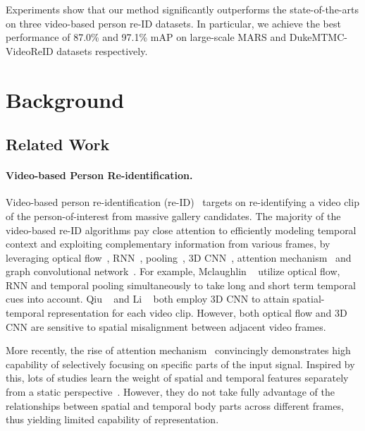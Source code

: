 \documentclass[10pt,twocolumn,letterpaper]{article}
\begin{document}
Experiments show that our method significantly outperforms the state-of-the-arts on three video-based person re-ID datasets. In particular, we achieve the best performance of 87.0\% and 97.1\% mAP on large-scale MARS and DukeMTMC-VideoReID datasets respectively.


\section{Background}
\label{sec:background}

\subsection{Related Work}

\paragraph{Video-based Person Re-identification.}
Video-based person re-identification (re-ID)~\cite{zheng2016mars} targets on re-identifying a video clip of the person-of-interest from massive gallery candidates.
The majority of the video-based re-ID algorithms pay close attention to efficiently modeling temporal context and exploiting complementary information from various frames, by leveraging optical flow~\cite{mclaughlin2016recurrent,chung2017two,chen2020temporal}, RNN~\cite{yan2016person,zhou2017see,xu2017jointly,liu2019spatial}, pooling~\cite{zheng2016mars,wu2018exploit}, 3D CNN~\cite{qiu2017learning,li2019multi,gu2020appearance}, attention mechanism~\cite{li2018diversity,fu2019sta,liu2019spatially,li2019global,zhang2020multi} and graph convolutional network~\cite{yang2020spatial,yan2020learning}. For example, Mclaughlin \etal~\cite{mclaughlin2016recurrent} utilize optical flow, RNN and temporal pooling simultaneously to take long and short term temporal cues into account. Qiu \etal~\cite{qiu2017learning} and Li \etal~\cite{li2019multi} both employ 3D CNN to attain spatial-temporal representation for each video clip. However, both optical flow and 3D CNN are sensitive to spatial misalignment between adjacent video frames.

More recently, the rise of attention mechanism~\cite{bahdanau2015neural} convincingly demonstrates high capability of selectively focusing on specific parts of the input signal. Inspired by this, lots of studies learn the weight of spatial and temporal features separately from a static perspective~\cite{liu2017quality,zhou2017see,xu2017jointly,li2018diversity,fu2019sta,hou2019vrstc,li2019global,subramaniam2019co,hou2020temporal}. However, they do not take fully advantage of the relationships between spatial and temporal body parts across different frames, thus yielding limited capability of representation.
\end{document}
